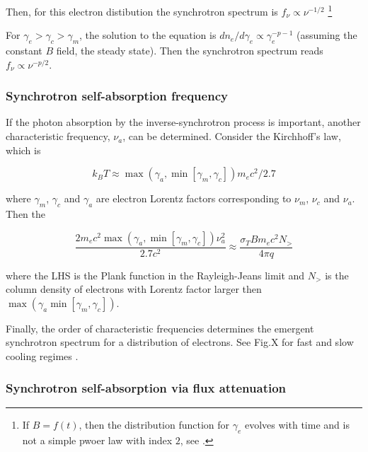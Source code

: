 Then, for this electron distibution the synchrotron spectrum is $f_{\nu}\propto\nu^{-1/2}$ 
\footnote{If $B=f(t)$, then the distribution function for $\gamma_e$ evolves with time and is not a simple pwoer law with index $2$, see \citet{Uhm:2013gwa}.}

For $\gamma_e > \gamma_c > \gamma_m$, the solution to the equation is $dn_e/d\gamma_e \propto \gamma_e^{-p-1}$ (assuming the constant $B$ field, the steady state). Then the synchrotron spectrum reads $f_{\nu}\propto\nu^{-p/2}$.


\subsubsection{Synchrotron self-absorption frequency}

If the photon absorption by the inverse-synchrotron process is important, another characteristic frequency, $\nu_a$, can be determined. Consider the Kirchhoff's law,  which is

\begin{equation}
k_BT\approx \max(\gamma_a,\min[\gamma_m,\gamma_c])m_e c^2 / 2.7
\end{equation}

where $\gamma_m$, $\gamma_c$ and $\gamma_a$ are electron Lorentz factors corresponding to $\nu_m$, $\nu_c$ and $\nu_a$.
Then the 

\begin{equation}
\frac{2m_ec^2\max(\gamma_a,\min[\gamma_m,\gamma_c])\nu_a^2}{2.7c^2}\approx\frac{\sigma_T B m_e c^2 N_>}{4 \pi q}
\end{equation}

where the LHS is the Plank function in the Rayleigh-Jeans limit and $N_{>}$ is the column density of electrons with Lorentz factor larger then $\max(\gamma_a\min[\gamma_m,\gamma_c])$.

Finally, the order of characteristic frequencies determines the emergent synchrotron spectrum for a distribution of electrons. 
See Fig.X for fast and slow cooling regimes \citet{Sari:1997qe}.


\subsubsection{Synchrotron self-absorption via flux attenuation}

